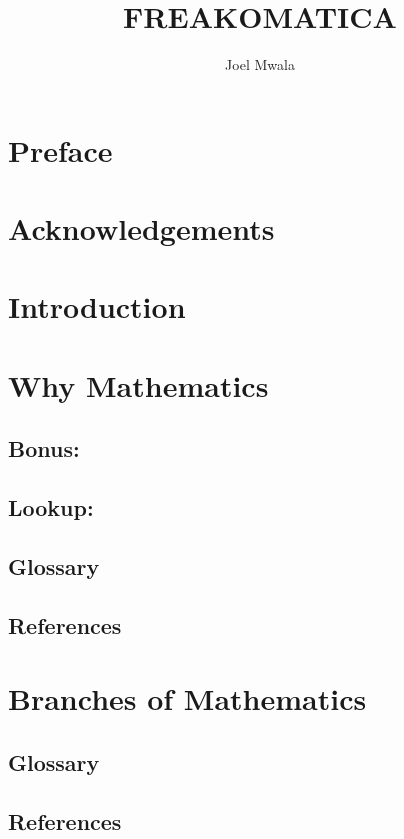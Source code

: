 \documentclass{report}
\title{FREAKOMATICA}
\author{Joel Mwala}
\begin{document}
\maketitle
\pagebreak

\chapter*{Preface}
\pagebreak


\tableofcontents
\pagebreak

\chapter*{Acknowledgements}
\pagebreak

\chapter{Introduction}

\pagebreak

\chapter{Why Mathematics} %

\section{Bonus: }%
\section{Lookup: }%
\section{Glossary}
\section{References}
\pagebreak

\chapter{Branches of Mathematics}%
\section{Glossary}
\section{References}
\pagebreak
\end{document}
